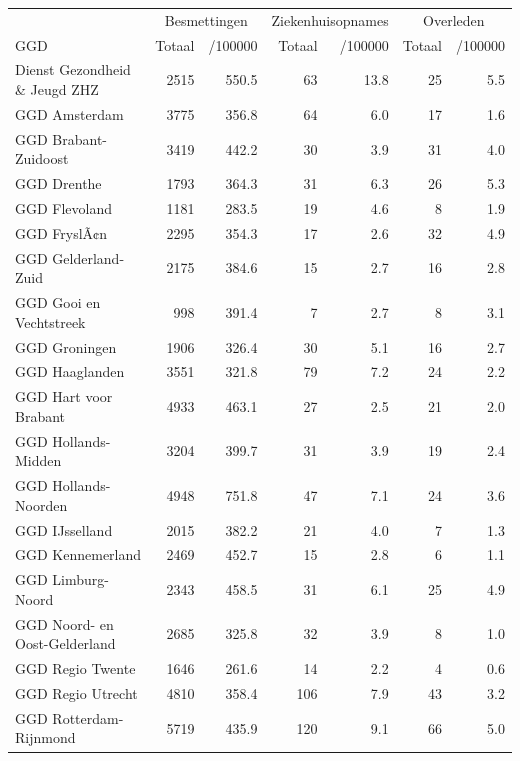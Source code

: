 \documentclass[
  english,
  man,floatsintext]{apa6}
\begin{document}
\begin{table}
\centering\begingroup\fontsize{10}{12}\selectfont

\begin{threeparttable}
\begin{tabular}{lrrrrrr}
\toprule
\multicolumn{1}{c}{ } & \multicolumn{2}{c}{Besmettingen} & \multicolumn{2}{c}{Ziekenhuisopnames} & \multicolumn{2}{c}{Overleden} \\
\cmidrule(l{3pt}r{3pt}){2-3} \cmidrule(l{3pt}r{3pt}){4-5} \cmidrule(l{3pt}r{3pt}){6-7}
GGD & Totaal & /100000 & Totaal & /100000 & Totaal & /100000\\
\midrule
Dienst Gezondheid \& Jeugd ZHZ & 2515 & 550.5 & 63 & 13.8 & 25 & 5.5\\
GGD Amsterdam & 3775 & 356.8 & 64 & 6.0 & 17 & 1.6\\
GGD Brabant-Zuidoost & 3419 & 442.2 & 30 & 3.9 & 31 & 4.0\\
GGD Drenthe & 1793 & 364.3 & 31 & 6.3 & 26 & 5.3\\
GGD Flevoland & 1181 & 283.5 & 19 & 4.6 & 8 & 1.9\\
GGD FryslÃ¢n & 2295 & 354.3 & 17 & 2.6 & 32 & 4.9\\
GGD Gelderland-Zuid & 2175 & 384.6 & 15 & 2.7 & 16 & 2.8\\
GGD Gooi en Vechtstreek & 998 & 391.4 & 7 & 2.7 & 8 & 3.1\\
GGD Groningen & 1906 & 326.4 & 30 & 5.1 & 16 & 2.7\\
GGD Haaglanden & 3551 & 321.8 & 79 & 7.2 & 24 & 2.2\\
GGD Hart voor Brabant & 4933 & 463.1 & 27 & 2.5 & 21 & 2.0\\
GGD Hollands-Midden & 3204 & 399.7 & 31 & 3.9 & 19 & 2.4\\
GGD Hollands-Noorden & 4948 & 751.8 & 47 & 7.1 & 24 & 3.6\\
GGD IJsselland & 2015 & 382.2 & 21 & 4.0 & 7 & 1.3\\
GGD Kennemerland & 2469 & 452.7 & 15 & 2.8 & 6 & 1.1\\
GGD Limburg-Noord & 2343 & 458.5 & 31 & 6.1 & 25 & 4.9\\
GGD Noord- en Oost-Gelderland & 2685 & 325.8 & 32 & 3.9 & 8 & 1.0\\
GGD Regio Twente & 1646 & 261.6 & 14 & 2.2 & 4 & 0.6\\
GGD Regio Utrecht & 4810 & 358.4 & 106 & 7.9 & 43 & 3.2\\
GGD Rotterdam-Rijnmond & 5719 & 435.9 & 120 & 9.1 & 66 & 5.0\\

\end{tabular}
\end{threeparttable}
\end{table}
\end{document}
